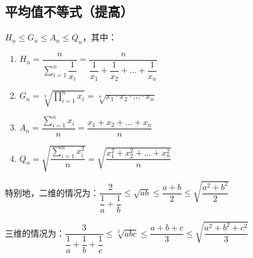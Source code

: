 \subsection*{平均值不等式（提高）}
$H_n \leq G_n \leq A_n \leq Q_n$，其中：
\begin{enumerate}
    \item $H_n = \dfrac{n}{\sum_{i=1}^{n}\dfrac{1}{x_i}} = \dfrac{n}{\dfrac{1}{x_1} + \dfrac{1}{x_2} + ... + \dfrac{1}{x_n}}$
    \item $G_n = \sqrt[n]{\prod_{i=1}^{n}x_i} = \sqrt[n]{x_1 \cdot x_2 \cdot ... \cdot x_n}$
    \item $A_n = \dfrac{\sum_{i=1}^{n}x_i}{n} = \dfrac{x_1 + x_2 + ... + x_n}{n}$
    \item $Q_n = \sqrt{\dfrac{\sum_{i=1}^{n}x_i^2}{n}} = \sqrt{\dfrac{x_1^2 + x_2^2 + ... + x_n^2}{n}}$
\end{enumerate}

特别地，二维的情况为：$\dfrac{2}{\dfrac{1}{a} + \dfrac{1}{b}} \leq \sqrt{ab} \leq \dfrac{a+b}{2} \leq \sqrt{\dfrac{a^2 + b^2}{2}}$ \\
\par 三维的情况为：$\dfrac{3}{\dfrac{1}{a} + \dfrac{1}{b} + \dfrac{1}{c}} \leq \sqrt[3]{abc} \leq \dfrac{a+b+c}{3} \leq \sqrt{\dfrac{a^2 + b^2 + c^2}{3}}$

